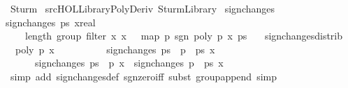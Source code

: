 %
\begin{isabellebody}%
\def\isabellecontext{Sturm}%
%
\isadelimtheory
%
\endisadelimtheory
%
\isatagtheory
{}\isamarkupfalse%
\ Sturm\isanewline
{}\ {\isachardoublequoteopen}{\isachartilde}{\isachartilde}{\isacharslash}src{\isacharslash}HOL{\isacharslash}Library{\isacharslash}Poly{\isacharunderscore}Deriv{\isachardoublequoteclose}\ Sturm{\isacharunderscore}Library\isanewline
{}%
\endisatagtheory
{\isafoldtheory}%
%
\isadelimtheory
%
\endisadelimtheory
%
\isamarkuptrue%
\isamarkupfalse%
\ sign{\isacharunderscore}changes\ \isanewline
{\isachardoublequoteopen}sign{\isacharunderscore}changes\ ps\ {\isacharparenleft}x{\isacharcolon}{\isacharcolon}real{\isacharparenright}\ {\isacharequal}\ \isanewline
\ \ \ \ length\ {\isacharparenleft}group\ {\isacharparenleft}filter\ {\isacharparenleft}{\isasymlambda}x{\isachardot}\ x\ {\isasymnoteq}\ {}{\isacharparenright}\ {\isacharparenleft}map\ {\isacharparenleft}{\isasymlambda}p{\isachardot}\ sgn\ {\isacharparenleft}poly\ p\ x{\isacharparenright}{\isacharparenright}\ ps{\isacharparenright}{\isacharparenright}{\isacharparenright}\ {\isacharminus}\ {}{\isachardoublequoteclose}\isanewline
\isanewline
{}\isamarkupfalse%
\ sign{\isacharunderscore}changes{\isacharunderscore}distrib{\isacharcolon}\isanewline
\ \ {\isachardoublequoteopen}poly\ p\ x\ {\isasymnoteq}\ {}\ {\isasymLongrightarrow}\ \isanewline
\ \ \ \ \ \ sign{\isacharunderscore}changes\ {\isacharparenleft}ps\ {\isacharat}\ {\isacharbrackleft}p{\isacharbrackright}\ {\isacharat}\ ps\ x\ {\isacharequal}\ \isanewline
\ \ \ \ \ \ sign{\isacharunderscore}changes\ {\isacharparenleft}ps\ {\isacharat}\ {\isacharbrackleft}p{\isacharbrackright}{\isacharparenright}\ x\ {\isacharplus}\ sign{\isacharunderscore}changes\ {\isacharparenleft}{\isacharbrackleft}p{\isacharbrackright}\ {\isacharat}\ ps\ x{\isachardoublequoteclose}\isanewline
%
\isadelimproof
\ \ %
\endisadelimproof
%
\isatagproof
{}\isamarkupfalse%
\ {\isacharparenleft}simp\ add{\isacharcolon}\ sign{\isacharunderscore}changes{\isacharunderscore}def\ sgn{\isacharunderscore}zero{\isacharunderscore}iff{\isacharcomma}\ subst\ group{\isacharunderscore}append{\isacharcomma}\ simp{\isacharparenright}%
\endisatagproof
{\isafoldproof}%

\end{isabellebody}
